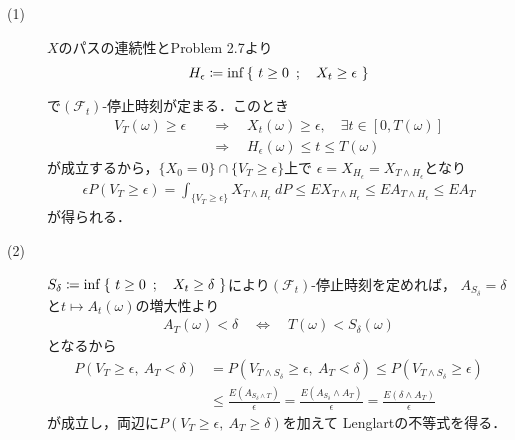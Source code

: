 	\begin{prf}\mbox{}
		\begin{description}
			\item[(1)] $X$のパスの連続性とProblem 2.7より
				\begin{align}
					H_\epsilon \coloneqq \operatorname*{inf}_{} \left\{\ t \geq 0\ \, ; \quad X_t \geq \epsilon\ \right\}
				\end{align}
				で$(\mathscr{F}_t)$-停止時刻が定まる．このとき
				\begin{align}
					V_T(\omega) \geq \epsilon 
					&\quad \Longrightarrow \quad
					X_t(\omega) \geq \epsilon, \quad \exists t \in [0,T(\omega)] \\
					&\quad \Longrightarrow \quad
					H_\epsilon(\omega) \leq t \leq T(\omega)
				\end{align}
				が成立するから，$\{X_0 = 0\} \cap \{V_T \geq \epsilon\}$上で
				$\epsilon = X_{H_\epsilon} = X_{T \wedge H_\epsilon}$となり
				\begin{align}
					\epsilon P(V_T \geq \epsilon)
					= \int_{\{V_T \geq \epsilon\}} X_{T \wedge H_\epsilon}\ dP
					\leq EX_{T \wedge H_\epsilon}
					\leq EA_{T \wedge H_\epsilon}
					\leq EA_T
				\end{align}
				が得られる．
				
			\item[(2)] $S_\delta \coloneqq \operatorname*{inf}_{} \left\{\ t \geq 0\ \, ; \quad X_t \geq \delta\ \right\}$により$(\mathscr{F}_t)$-停止時刻を定めれば，
				$A_{S_\delta} = \delta$と$t \longmapsto A_t(\omega)$の増大性より
				\begin{align}
					A_T(\omega) < \delta \quad \Longleftrightarrow \quad
					T(\omega) < S_\delta(\omega)
				\end{align}
				となるから
				\begin{align}
					P\left( V_T \geq \epsilon,\ A_T < \delta \right)
					&= P\left( V_{T \wedge S_\delta} \geq \epsilon,\ A_T < \delta \right)
					\leq P\left( V_{T \wedge S_\delta} \geq \epsilon \right) \\
					&\leq \frac{E(A_{S_\delta \wedge T})}{\epsilon}
					= \frac{E(A_{S_\delta} \wedge A_T)}{\epsilon}
					= \frac{E(\delta \wedge A_T)}{\epsilon}
				\end{align}
				が成立し，両辺に$P\left( V_T \geq \epsilon,\ A_T \geq \delta \right)$を加えて
				Lenglartの不等式を得る．
				

\end{description}
\end{prf}
